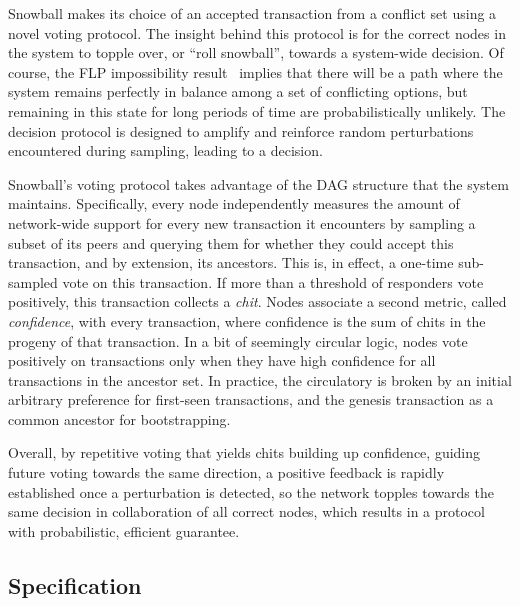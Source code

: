Snowball makes its choice of an accepted transaction from a conflict set using a novel voting protocol.
The insight behind this protocol is for the correct nodes in the system to topple over, or ``roll snowball'', towards a system-wide decision.
Of course, the FLP impossibility result~\cite{fischer1985impossibility}
implies that there will be a path where the system remains perfectly in balance among a set of conflicting options, but remaining in this state for long periods of time are probabilistically unlikely.
The decision protocol is designed to amplify and reinforce random perturbations encountered during sampling, leading to a decision.

Snowball's voting protocol takes advantage of the DAG structure that the system maintains.
Specifically, every node independently measures the amount of network-wide support for every new transaction it encounters by sampling a subset of its peers and querying them for whether they could accept this transaction, and by extension, its ancestors.
This is, in effect, a one-time sub-sampled vote on this transaction.
If more than a threshold of responders vote positively, this transaction collects a \emph{chit}.
Nodes associate a second metric, called \emph{confidence}, with every transaction, where confidence is the sum of chits in the progeny of that transaction.
In a bit of seemingly circular logic, nodes vote positively on transactions only when they have high confidence for all transactions in the ancestor set.
In practice, the circulatory is broken by an initial arbitrary preference for first-seen transactions, and the genesis transaction as a common ancestor for bootstrapping.

Overall, %
by repetitive voting that yields chits building up confidence,
guiding future voting towards the same direction, a positive
feedback is rapidly established once a perturbation is detected, so the network
topples towards the same decision in collaboration of all correct nodes, which
results in a protocol with probabilistic, efficient guarantee.

\subsection{Specification}
\label{subsection:specification}


